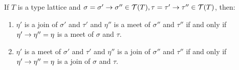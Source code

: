 \documentclass[main.tex]{subfiles}
\begin{document}
\begin{lemma}
    \label{lemma:complexmeet}
    If $T$ is a type lattice and $\sigma = \sigma' \rightarrow \sigma'' \in \mathcal{T}( T ),
    \tau = \tau' \rightarrow \tau'' \in \mathcal{T}( T )$,
    then:
    \begin{enumerate}
        \item \label{loc:fdir} $\eta'$ is a join of $\sigma'$ and $\tau'$ and
            $\eta''$ is a meet of $\sigma''$ and $\tau''$ if and only if
            $\eta' \rightarrow \eta'' = \eta$ is a meet of $\sigma$ and $\tau$.
        \item $\eta'$ is a meet of $\sigma'$ and $\tau'$ and
            $\eta''$ is a join of $\sigma''$ and $\tau''$ if and only if
            $\eta' \rightarrow \eta'' = \eta$ is a join of $\sigma$ and $\tau$.
    \end{enumerate}
\end{lemma}
\end{document}

